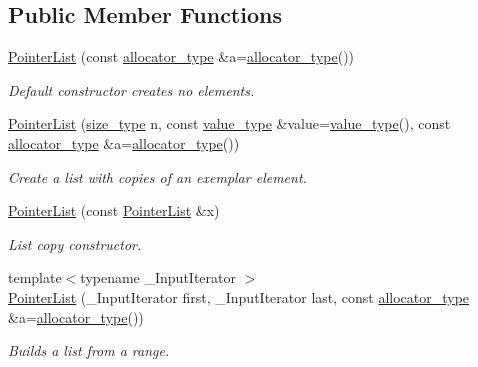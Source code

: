 \subsection*{Public Member Functions}
\begin{DoxyCompactItemize}
\item 
\hyperlink{classutils_1_1PointerList_aabad19d5a33c52b25ea3c7ff65fff4bd}{Pointer\+List} (const \hyperlink{classutils_1_1PointerList_a3b41bb503c3d41a7120b1a9cd1ba9848}{allocator\+\_\+type} \&a=\hyperlink{classutils_1_1PointerList_a3b41bb503c3d41a7120b1a9cd1ba9848}{allocator\+\_\+type}())
\begin{DoxyCompactList}\small\item\em Default constructor creates no elements. \end{DoxyCompactList}\item 
\hyperlink{classutils_1_1PointerList_afc8d53379d6f553abb47460eb589f67c}{Pointer\+List} (\hyperlink{classutils_1_1PointerList_a8d7b485e236a01cc14b41694ae0b3456}{size\+\_\+type} n, const \hyperlink{classutils_1_1PointerList_af1c536b3d0d508b69700ad038ea5279a}{value\+\_\+type} \&value=\hyperlink{classutils_1_1PointerList_af1c536b3d0d508b69700ad038ea5279a}{value\+\_\+type}(), const \hyperlink{classutils_1_1PointerList_a3b41bb503c3d41a7120b1a9cd1ba9848}{allocator\+\_\+type} \&a=\hyperlink{classutils_1_1PointerList_a3b41bb503c3d41a7120b1a9cd1ba9848}{allocator\+\_\+type}())
\begin{DoxyCompactList}\small\item\em Create a list with copies of an exemplar element. \end{DoxyCompactList}\item 
\hyperlink{classutils_1_1PointerList_a134b56062d58f09feb8a2fcdb1f013d6}{Pointer\+List} (const \hyperlink{classutils_1_1PointerList}{Pointer\+List} \&x)
\begin{DoxyCompactList}\small\item\em List copy constructor. \end{DoxyCompactList}\item 
{\footnotesize template$<$typename \+\_\+\+Input\+Iterator $>$ }\\\hyperlink{classutils_1_1PointerList_aca676638d7eb111ee7800cfe6e74a3ee}{Pointer\+List} (\+\_\+\+Input\+Iterator first, \+\_\+\+Input\+Iterator last, const \hyperlink{classutils_1_1PointerList_a3b41bb503c3d41a7120b1a9cd1ba9848}{allocator\+\_\+type} \&a=\hyperlink{classutils_1_1PointerList_a3b41bb503c3d41a7120b1a9cd1ba9848}{allocator\+\_\+type}())
\begin{DoxyCompactList}\small\item\em Builds a list from a range. \end{DoxyCompactList}\item 

\end{DoxyCompactItemize}
